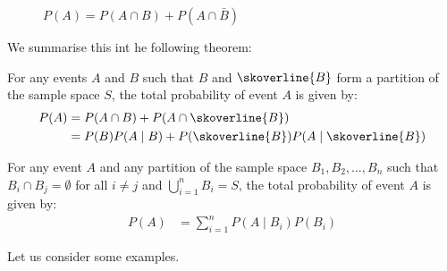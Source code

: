 \begin{figure}[htbp]
    \centering
        \caption{$P(A)=P(A \cap B)+P(A \cap \bar{B})$}
        \label{fig:decoA}
\end{figure}

We summarise this int he following theorem:

\begin{theorem}
For any events \( A \) and \( B \) such that \( B \) and \( \skoverline{B} \) form a partition of the sample space \( S \), the total probability of event \( A \) is given by:
    \begin{align*}
    P(A) &= P(A \cap B) + P(A \cap \skoverline{B}) \\
    &= P(B) P(A \mid B) + P(\skoverline{B}) P(A \mid \skoverline{B})
    \end{align*}

    For any event \( A \) and any partition of the sample space \( B_1, B_2, \ldots, B_n \) such that \( B_i \cap B_j = \emptyset \) for all \( i \neq j \) and \( \bigcup_{i=1}^{n} B_i = S \), the total probability of event \( A \) is given by:
    \begin{align*}
    P(A) &= \sum_{i=1}^{n} P(A \mid B_i) P(B_i)
    \end{align*}
\end{theorem}

Let us consider some examples.

